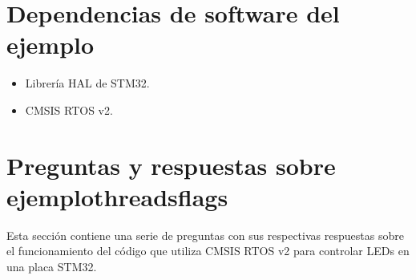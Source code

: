 \documentclass[letterpaper,10pt,english]{sphinxmanual}
\begin{document}
\begin{sphinxVerbatim}[commandchars=\\\{\}]


\end{sphinxVerbatim}


\section{Dependencias de software del ejemplo}
\label{\detokenize{ejemplothreads-flags:dependencias-de-software-del-ejemplo}}\begin{itemize}
\item {} 
\sphinxAtStartPar
Librería HAL de STM32.

\item {} 
\sphinxAtStartPar
CMSIS RTOS v2.

\end{itemize}


\section{Preguntas y respuestas sobre ejemplothreads\sphinxhyphen{}flags}
\label{\detokenize{ejemplothreads-flags:preguntas-y-respuestas-sobre-ejemplothreads-flags}}
\sphinxAtStartPar
Esta sección contiene una serie de preguntas con sus respectivas respuestas sobre el funcionamiento del código que utiliza CMSIS RTOS v2 para controlar LEDs en una placa STM32.
\end{document}
